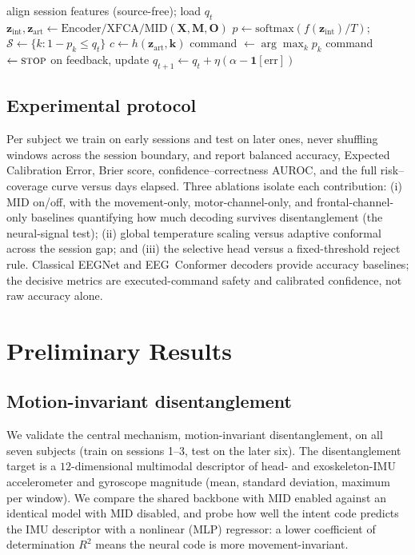\documentclass[journal]{IEEEtran}
\begin{document}
\begin{algorithm}[t]
\caption{CALM-Net deployment on session $s$ (per window)}
\label{alg:deploy}
\begin{algorithmic}[1]
\State align session features (source-free); load $q_t$
\State $\mathbf{z}_{\mathrm{int}},\mathbf{z}_{\mathrm{art}}\leftarrow \mathrm{Encoder/XFCA/MID}(\mathbf{X},\mathbf{M},\mathbf{O})$
\State $p\leftarrow \mathrm{softmax}(f(\mathbf{z}_{\mathrm{int}})/T)$;\quad
       $\mathcal{S}\leftarrow\{k:1-p_k\le q_t\}$
\State $c\leftarrow h(\mathbf{z}_{\mathrm{art}},\mathbf{k})$
   \State command $\leftarrow \arg\max_k p_k$
\Else
   \State command $\leftarrow \textsc{stop}$ 
\EndIf
\State on feedback, update $q_{t+1}\leftarrow q_t+\eta(\alpha-\mathbf{1}[\text{err}])$
\end{algorithmic}
\end{algorithm}

\subsection{Experimental protocol}
Per subject we train on early sessions and test on later ones, never shuffling
windows across the session boundary, and report balanced accuracy, Expected
Calibration Error, Brier score, confidence--correctness AUROC, and the full
risk--coverage curve versus days elapsed. Three ablations isolate each contribution:
(i) MID on/off, with the movement-only, motor-channel-only, and frontal-channel-only
baselines quantifying how much decoding survives disentanglement (the neural-signal
test); (ii) global temperature scaling versus adaptive conformal across the session
gap; and (iii) the selective head versus a fixed-threshold reject rule. Classical
EEGNet and EEG~Conformer decoders provide accuracy baselines; the decisive metrics
are executed-command safety and calibrated confidence, not raw accuracy alone.

\section{Preliminary Results}\label{sec:valid}
\subsection{Motion-invariant disentanglement}
We validate the central mechanism, motion-invariant disentanglement, on all seven
subjects (train on sessions 1--3, test on the later six). The disentanglement
target is a $12$-dimensional multimodal descriptor of head- and exoskeleton-IMU
accelerometer and gyroscope magnitude (mean, standard deviation, maximum per
window). We compare the shared backbone with MID enabled against an identical model
with MID disabled, and probe how well the intent code predicts the IMU descriptor
with a nonlinear (MLP) regressor: a lower coefficient of determination $R^2$ means
the neural code is more movement-invariant.
\end{document}
